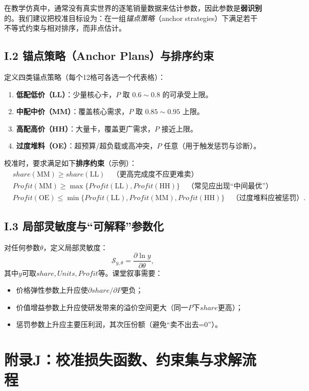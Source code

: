 \documentclass[UTF8,12pt]{ctexart}
\begin{document}
在教学仿真中，通常没有真实世界的逐笔销量数据来估计参数，因此参数是\textbf{弱识别}的。我们建议把校准目标设为：在一组\emph{锚点策略}（anchor strategies）下满足若干不等式约束与相对排序，而非点估计。

\subsection{I.2 锚点策略（Anchor Plans）与排序约束}
定义四类锚点策略（每个12格可各选一个代表格）：
\begin{enumerate}[label=(\alph*)]
  \item \textbf{低配低价（LL）}：少量核心卡，$P$ 取 $0.6\sim0.8$ 的可承受上限。
  \item \textbf{中配中价（MM）}：覆盖核心需求，$P$ 取 $0.85\sim0.95$ 上限。
  \item \textbf{高配高价（HH）}：大量卡，覆盖更广需求，$P$ 接近上限。
  \item \textbf{过度堆料（OE）}：超预算/超负载或高冲突，$P$ 任意（用于触发惩罚与诊断）。
\end{enumerate}

校准时，要求满足如下\textbf{排序约束}（示例）：
\begin{align*}
&share(\mathrm{MM}) \ge share(\mathrm{LL}) \quad\text{（更高完成度不应更难卖）}\\
&Profit(\mathrm{MM}) \ge \max\{Profit(\mathrm{LL}),Profit(\mathrm{HH})\} \quad\text{（常见应出现“中间最优”）}\\
&Profit(\mathrm{OE}) \le \min\{Profit(\mathrm{LL}),Profit(\mathrm{MM}),Profit(\mathrm{HH})\} \quad\text{（过度堆料应被惩罚）}.
\end{align*}

\subsection{I.3 局部灵敏度与“可解释”参数化}
对任何参数$\theta$，定义局部灵敏度：
\[
\mathcal{S}_{y,\theta}=\frac{\partial \ln y}{\partial \theta},
\]
其中$y$可取$share,Units,Profit$等。课堂叙事需要：
\begin{itemize}
  \item 价格弹性参数上升应使$\partial share/\partial P$更负；
  \item 价值增益参数上升应使研发带来的溢价空间更大（同一$P$下$share$更高）；
  \item 惩罚参数上升应主要压利润，其次压份额（避免“卖不出去=0”）。
\end{itemize}

\section{附录J：校准损失函数、约束集与求解流程}
\end{document}

